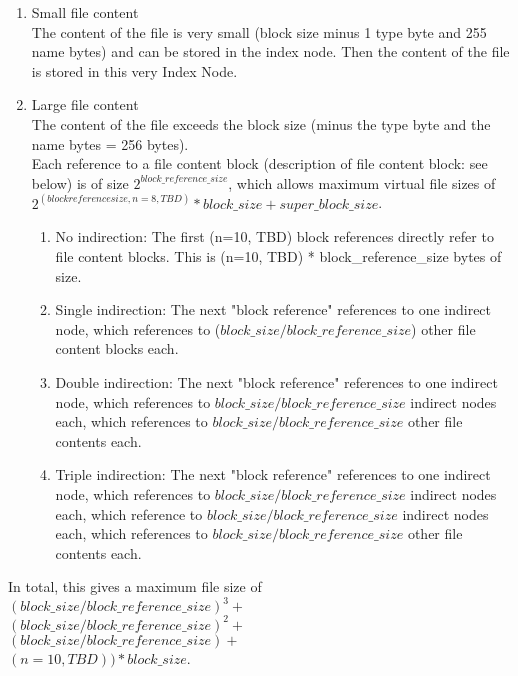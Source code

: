 \documentclass[a4paper,12pt]{article}
\begin{document}
\begin{enumerate}
  \item Small file content\\
  The content of the file is very small (block size minus 1 type byte and 255 name bytes) and can be stored in the index node. Then the content of the file is stored in this very Index Node.
  \item Large file content\\
The content of the file exceeds the block size (minus the type byte and the name bytes = 256 bytes).\\
Each reference to a file content block (description of file content block: see below) is of size $2^{block\_reference\_size}$, which allows maximum virtual file sizes of $2^{(block reference size, n=8, TBD)} * block\_size + super\_block\_size$.\\
\begin{enumerate}
  \item No indirection: The first (n=10, TBD) block references directly refer to file content blocks. This is (n=10, TBD) * block\_reference\_size bytes of size.
  \item Single indirection: The next "block reference" references to one indirect node, which references to ($block\_size / block\_reference\_size$) other file content blocks each.
  \item Double indirection: The next "block reference" references to one indirect node, which references to $block\_size / block\_reference\_size$ indirect nodes each, which references to $block\_size / block\_reference\_size$ other file contents each.
  \item Triple indirection: The next "block reference" references to one indirect node, which references to $block\_size / block\_reference\_size$ indirect nodes each, which reference to $block\_size / block\_reference\_size$ indirect nodes each, which references to $block\_size / block\_reference\_size$ other file contents each.
\end{enumerate}
\end{enumerate}

In total, this gives a maximum file size of\\
$(block\_size / block\_reference\_size)^{3} +$\\
$(block\_size / block\_reference\_size)^{2} +$\\
$(block\_size / block\_reference\_size) + $\\
$(n=10, TBD)) * block\_size$.\\
\end{document}

